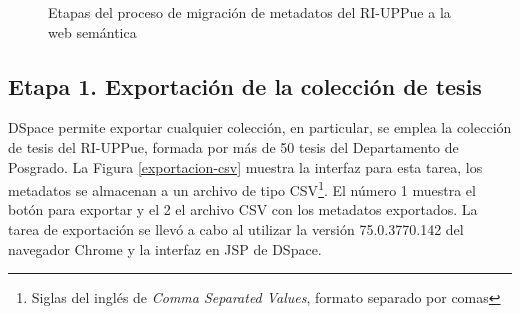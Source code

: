 \begin{figure}[!ht]
	\centering
    \caption{Etapas del proceso de migraci\'on de metadatos del RI-UPPue a la web sem\'antica} %
    \label{etapasMigracion}
\end{figure}

\subsection{Etapa 1. Exportaci\'on de la colecci\'on de tesis}

DSpace permite exportar cualquier colecci\'on, en particular, se emplea la colecci\'on de tesis del RI-UPPue, formada por m\'as de  50 tesis del Departamento de Posgrado. La Figura \ref{exportacion-csv} muestra la interfaz para esta tarea, los metadatos se almacenan a un archivo de tipo CSV\footnote{Siglas del ingl\'es de \emph{Comma Separated Values}, formato separado por comas}. El n\'umero 1 muestra el bot\'on para exportar y el 2 el archivo CSV con los metadatos exportados. La tarea de exportaci\'on se llev\'o a cabo al utilizar la versi\'on 75.0.3770.142 del navegador Chrome y la interfaz en JSP de DSpace.

